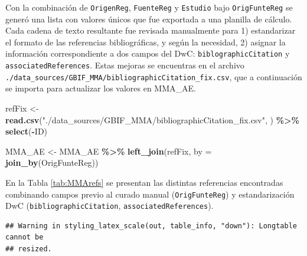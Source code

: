 \documentclass[sn-apa,pdflatex]{sn-jnl}
\newenvironment{Shaded}{\begin{snugshade}}{\end{snugshade}}
\newcommand{\AttributeTok}[1]{\textcolor[rgb]{0.13,0.29,0.53}{#1}}
\newcommand{\FunctionTok}[1]{\textcolor[rgb]{0.13,0.29,0.53}{\textbf{#1}}}
\newcommand{\NormalTok}[1]{#1}
\newcommand{\OtherTok}[1]{\textcolor[rgb]{0.56,0.35,0.01}{#1}}
\newcommand{\SpecialCharTok}[1]{\textcolor[rgb]{0.81,0.36,0.00}{\textbf{#1}}}
\newcommand{\StringTok}[1]{\textcolor[rgb]{0.31,0.60,0.02}{#1}}
\begin{document}
Con la combinación de \texttt{OrigenReg}, \texttt{FuenteReg} y
\texttt{Estudio} bajo \texttt{OrigFunteReg} se generó una lista con
valores únicos que fue exportada a una planilla de cálculo. Cada cadena
de texto resultante fue revisada manualmente para 1) estandarizar el
formato de las referencias bibliográficas, y según la necesidad, 2)
asignar la información correspondiente a dos campos del DwC:
\texttt{biblographicCitation} y \texttt{associatedReferences}. Estas
mejoras se encuentras en el archivo
\texttt{./data\_sources/GBIF\_MMA/bibliographicCitation\_fix.csv}, que a
continuación se importa para actualizar los valores en MMA\_AE.

\begin{Shaded}
\begin{Highlighting}[]
\NormalTok{refFix }\OtherTok{\textless{}{-}} \FunctionTok{read.csv}\NormalTok{(}\StringTok{"./data\_sources/GBIF\_MMA/bibliographicCitation\_fix.csv"}\NormalTok{,}
\NormalTok{    ) }\SpecialCharTok{\%\textgreater{}\%}
    \FunctionTok{select}\NormalTok{(}\SpecialCharTok{{-}}\NormalTok{ID)}

\NormalTok{MMA\_AE }\OtherTok{\textless{}{-}}\NormalTok{ MMA\_AE }\SpecialCharTok{\%\textgreater{}\%}
    \FunctionTok{left\_join}\NormalTok{(refFix, }\AttributeTok{by =} \FunctionTok{join\_by}\NormalTok{(OrigFunteReg))}
\end{Highlighting}
\end{Shaded}

En la Tabla \ref{tab:MMArefs} se presentan las distintas referencias
encontradas combinando campos previo al curado manual
(\texttt{OrigFunteReg}) y estandarización DwC
(\texttt{bibliographicCitation}, \texttt{associatedReferences}).\\
\newpage

\begin{verbatim}
## Warning in styling_latex_scale(out, table_info, "down"): Longtable cannot be
## resized.
\end{verbatim}

\begingroup\fontsize{8}{10}\selectfont
\end{document}
